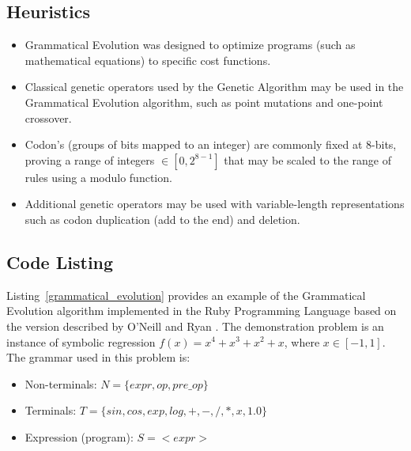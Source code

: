 \subsection{Heuristics}
\begin{itemize}
	\item Grammatical Evolution was designed to optimize programs (such as mathematical equations) to specific cost functions.
	\item Classical genetic operators used by the Genetic Algorithm may be used in the Grammatical Evolution algorithm, such as point mutations and one-point crossover.
	\item Codon's (groups of bits mapped to an integer) are commonly fixed at 8-bits, proving a range of integers $\in [0,2^{8-1}]$ that may be scaled to the range of rules using a modulo function.
	\item Additional genetic operators may be used with variable-length representations such as codon duplication (add to the end) and deletion.
\end{itemize}

\subsection{Code Listing}
Listing~\ref{grammatical_evolution} provides an example of the Grammatical Evolution algorithm implemented in the Ruby Programming Language based on the version described by O'Neill and Ryan \cite{O'Neill2001}.
The demonstration problem is an instance of symbolic regression $f(x)=x^4+x^3+x^2+x$, where $x\in[-1,1]$. 
The grammar used in this problem is: 
\begin{itemize}
	\item Non-terminals: $N=\{expr,op,pre\_op\}$
	\item Terminals: $T=\{sin,cos,exp,log,+,-,/,*,x,1.0\}$
	\item Expression (program): $S=<expr>$
\end{itemize}

